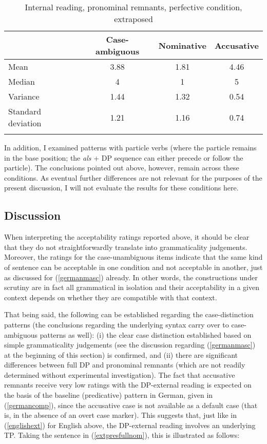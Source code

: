\begin{table}
\begin{tabular}{l *3{S[table-format=1.2]}}
\lsptoprule
{} & {Case-ambiguous} & {Nominative} & {Accusative}\\
\midrule
Mean & 3.88 & 1.81 & 4.46\\
Median & 4 & 1 & 5\\
Variance & 1.44 & 1.32 & 0.54\\
Standard deviation & 1.21 & 1.16 & 0.74\\
\lspbottomrule
\end{tabular}
\caption{Internal reading, pronominal remnants, perfective condition, extraposed}
\label{tableintperftproextr}
\end{table} 


In addition, I examined patterns with particle verbs (where the particle remains in the base position; the \textit{als} + DP sequence can either precede or follow the particle). The conclusions pointed out above, however, remain across these conditions. As eventual further differences are not relevant for the purposes of the present discussion, I will not evaluate the results for these conditions here.

\subsection{Discussion} \label{sec:6discussion}
When interpreting the acceptability ratings reported above, it should be clear that they do not straightforwardly translate into grammaticality judgements. Moreover, the ratings for the case-unambiguous items indicate that the same kind of sentence can be acceptable in one condition and not acceptable in another, just as discussed for (\ref{germanmasc}) already. In other words, the constructions under scrutiny are in fact all grammatical in isolation and their acceptability in a given context depends on whether they are compatible with that context.

That being said, the following can be established regarding the case-distinction patterns (the conclusions regarding the underlying syntax carry over to case-ambiguous patterns as well): (i) the clear case distinction established based on simple grammaticality judgements (see the discussion regarding (\ref{germanmasc}) at the beginning of this section) is confirmed, and (ii) there are significant differences between full DP and pronominal remnants (which are not readily determined without experimental investigation). The fact that accusative remnants receive very low ratings with the DP-external reading is expected on the basis of the baseline (predicative) pattern in German, given in (\ref{germancomp}), since the accusative case is not available as a default case (that is, in the absence of an overt case marker). This suggests that, just like in (\ref{englishext}) for English above, the DP-external reading involves an underlying TP. Taking the sentence in (\ref{extpresfullnom}), this is illustrated as follows:

